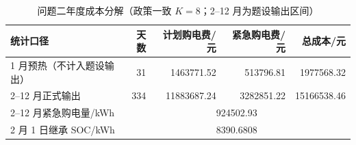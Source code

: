 \begin{table}[htbp]
\centering
\caption{问题二年度成本分解（政策一致 $K=8$；2--12 月为题设输出区间）}\label{tab:q2-cost-summary}
\normalsize\setlength{\tabcolsep}{6pt}
\begin{tabular}{@{}lrrrr@{}}
\toprule
统计口径 & 天数 & 计划购电费/元 & 紧急购电费/元 & 总成本/元 \\
\midrule
1 月预热（不计入题设输出） & 31 & 1463771.52 & 513796.81 & 1977568.32 \\
2--12 月正式输出 & 334 & 11883687.24 & 3282851.22 & 15166538.46 \\
\midrule
2--12 月紧急购电量/kWh & \multicolumn{4}{c}{924502.93} \\
2 月 1 日继承 SOC/kWh & \multicolumn{4}{c}{8390.6808} \\
\bottomrule
\end{tabular}
\end{table}
